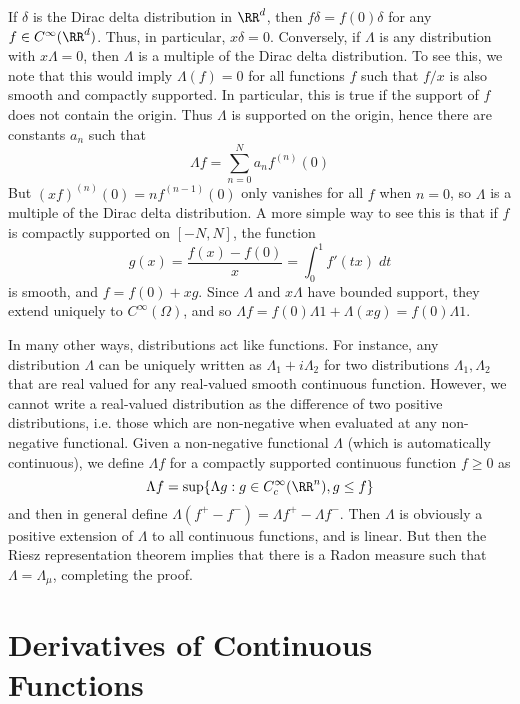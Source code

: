 \begin{example}
    If $\delta$ is the Dirac delta distribution in $\RR^d$, then $f \delta = f(0) \delta$ for any $f \in C^\infty(\RR^d)$. Thus, in particular, $x \delta = 0$. Conversely, if $\Lambda$ is any distribution with $x \Lambda = 0$, then $\Lambda$ is a multiple of the Dirac delta distribution. To see this, we note that this would imply $\Lambda(f) = 0$ for all functions $f$ such that $f/x$ is also smooth and compactly supported. In particular, this is true if the support of $f$ does not contain the origin. Thus $\Lambda$ is supported on the origin, hence there are constants $a_n$ such that
    \[ \Lambda f = \sum_{n = 0}^N a_n f^{(n)}(0) \]
    But $(xf)^{(n)}(0) = n f^{(n-1)}(0)$ only vanishes for all $f$ when $n = 0$, so $\Lambda$ is a multiple of the Dirac delta distribution. A more simple way to see this is that if $f$ is compactly supported on $[-N,N]$, the function
    \[ g(x) = \frac{f(x) - f(0)}{x} = \int_0^1 f'(tx)\; dt \]
    is smooth, and $f = f(0) + xg$. Since $\Lambda$ and $x \Lambda$ have bounded support, they extend uniquely to $C^\infty(\Omega)$, and so $\Lambda f = f(0) \Lambda 1 + \Lambda(xg) = f(0) \Lambda 1$.
\end{example}

In many other ways, distributions act like functions. For instance, any distribution $\Lambda$ can be uniquely written as $\Lambda_1 + i \Lambda_2$ for two distributions $\Lambda_1, \Lambda_2$ that are real valued for any real-valued smooth continuous function. However, we cannot write a real-valued distribution as the difference of two positive distributions, i.e. those which are non-negative when evaluated at any non-negative functional. Given a non-negative functional $\Lambda$ (which is automatically continuous),  we define $\Lambda f$ for a compactly supported continuous function $f \geq 0$ as
%
\[ \Lambda f = \sup \{ \Lambda g: g \in C_c^\infty(\RR^n), g \leq f \} \]
%
and then in general define $\Lambda (f^+ - f^-) = \Lambda f^+ - \Lambda f^-$. Then $\Lambda$ is obviously a positive extension of $\Lambda$ to all continuous functions, and is linear. But then the Riesz representation theorem implies that there is a Radon measure such that $\Lambda = \Lambda_\mu$, completing the proof.

\section{Derivatives of Continuous Functions}

